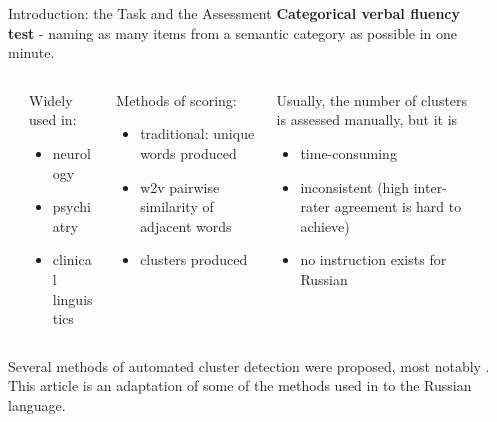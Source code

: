 \documentclass[xcolor=table]{beamer}
\newlength{\sepwidth}
\newcommand{\separatorcolumn}{\begin{column}{\sepwidth}\end{column}}
\begin{document}
\begin{frame}[t]
\begin{columns}[t]
    \separatorcolumn
    \begin{column}{0.6\paperwidth}
    \begin{block}{Introduction: the Task and the Assessment}
        \textbf{Categorical verbal fluency test} - naming as many items from a semantic category as possible in one minute.
        \vspace{1em}
        \begin{columns}[t]
        \separatorcolumn
        \begin{column}{0.1\paperwidth}
        Widely used in:
        \begin{itemize}
            \item neurology 
            \item psychiatry
            \item clinical linguistics
        \end{itemize}
        \end{column}
        \begin{column}{0.2\paperwidth}
            Methods of scoring:
            \begin{itemize}
                \item traditional: unique words produced
                \item w2v pairwise similarity of adjacent words
                \item clusters produced
            \end{itemize}
        \end{column}
        \begin{column}{0.3\paperwidth}
            Usually, the number of clusters is assessed manually, but it is
           \begin{itemize}
               \item time-consuming
               \item inconsistent (high inter-rater agreement is hard to achieve)
               \item no instruction exists for Russian \cite{drozd2015}
           \end{itemize}
        \end{column}
        \separatorcolumn
        \end{columns}
        \vspace{1em}
        Several methods of automated cluster detection were proposed, most notably \cite{kim2019}. This article is an adaptation of some of the methods used in \cite{kim2019} to the Russian language.

\end{block}
\end{column}
\end{columns}
\end{frame}
\end{document}

